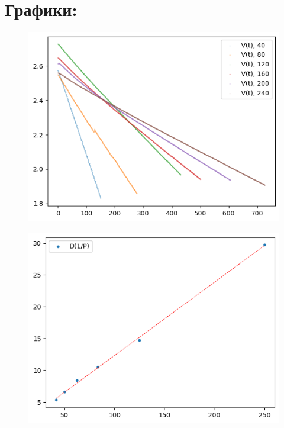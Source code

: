 \documentclass[11pt,a4paper]{article}
\begin{document}
\section*{\textbf{Графики:}}
\begin{figure}[h]
  \includegraphics*[width=\textwidth]{all.png}
  \label{fig:ust}
\end{figure}
\newpage
\begin{figure}[h]
  \includegraphics*[width=\textwidth]{dd(1p).png}
  \label{fig:ust}
\end{figure}
\end{document}

